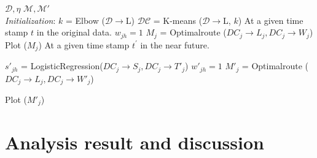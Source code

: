 \documentclass[conference,compsoc]{IEEEtran}
\begin{document}
\begin{algorithm}
	\caption{}
	\begin{algorithmic}[1]
		\renewcommand{\algorithmicrequire}{\textbf{Input:}}
		\renewcommand{\algorithmicensure}{\textbf{Output:}}
		\REQUIRE $\mathcal{D}, \eta$
		\ENSURE  $\mathcal{M}, \mathcal{M'}$
		\\ \textit{Initialization}: 
		\STATE $k$ = Elbow ($\mathcal{D}\rightarrow$L)
		\STATE $\mathcal{DC}$ = K-means ($\mathcal{D}\rightarrow$L, $k$)
		\STATE At a given time stamp $t$ in the original data.
		\STATE $w_{jh} = 1$
		\STATE $M_j$ = Optimalroute ($DC_j \rightarrow L_j, DC_j \rightarrow W_j$)
		\ENDIF
		\ENDFOR
		\STATE Plot ($M_j$)
		\ENDFOR
	\STATE At a given time stamp $t^{'}$ in the near future.

\STATE $s'_{jh}$ = LogisticRegression($DC_j \rightarrow S_j, DC_j \rightarrow T'_j$)
\STATE $w'_{jh} = 1$
\STATE $M'_j$ = Optimalroute ($DC_j \rightarrow L_j, DC_j \rightarrow W'_j$)
\ENDIF

\ENDFOR
\STATE Plot ($M'_j$)
\ENDFOR

	\end{algorithmic} 
\label{algorithm1}
\end{algorithm}


\section{Analysis result and discussion}
%
%
 
\end{document}
